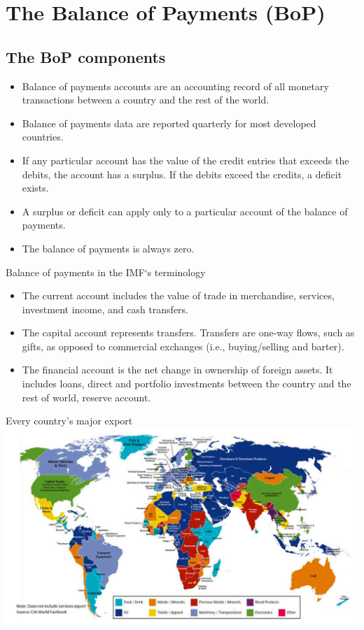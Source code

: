 \documentclass[international_finance_p1.tex]{subfiles}
\begin{document}
\section{The Balance of Payments (BoP)}
\subsection{The BoP components}
\begin{frame}{}
\begin{itemize}[<+->]
\item
Balance of payments accounts are an accounting record of all monetary transactions between a country and the rest of the world.
\item
Balance of payments data are reported quarterly for most developed countries.
\item
If any particular account has the value of the credit entries that exceeds the debits, the account has a surplus. If the debits exceed the credits, a deficit exists.
\item
A surplus or deficit can apply only to a particular account of the balance of payments.
\item
The balance of payments is always zero.
\end{itemize}
\end{frame}
\begin{frame}{Balance of payments in the IMF`s terminology}
\begin{itemize}[<+->]
\item
The current account includes the value of trade in merchandise, services, investment income, and cash transfers.
\item
The capital account represents transfers. Transfers are one-way flows, such as gifts, as opposed to commercial exchanges (i.e., buying/selling and barter).
\item
The financial account is the net change in ownership of foreign assets. It includes loans, direct and portfolio investments between the country and the rest of world, reserve account.
\end{itemize}
\end{frame}
\begin{frame}{Every country’s major export}
\includegraphics[scale=0.3]{img/exportbycountry}
\end{frame}
\end{document}
